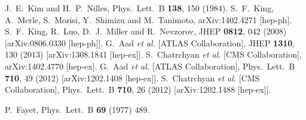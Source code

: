 \documentclass[final,3p,11pt,pdflatex]{elsarticle}
\begin{document}
\begin{thebibliography}{100}
  J.~E.~Kim and H.~P.~Nilles,
  Phys.\ Lett.\ B {\bf 138}, 150 (1984).
  S.~F.~King, A.~Merle, S.~Morisi, Y.~Shimizu and M.~Tanimoto,
  arXiv:1402.4271 [hep-ph].
  S.~F.~King, R.~Luo, D.~J.~Miller and R.~Nevzorov,
  JHEP {\bf 0812}, 042 (2008)
  [arXiv:0806.0330 [hep-ph]].
  G.~Aad {\it et al.}  [ATLAS Collaboration],
  JHEP {\bf 1310}, 130 (2013)
  [arXiv:1308.1841 [hep-ex]].
  S.~Chatrchyan {\it et al.}  [CMS Collaboration],
  arXiv:1402.4770 [hep-ex].
  G.~Aad {\it et al.}  [ATLAS Collaboration],
  Phys.\ Lett.\ B {\bf 710}, 49 (2012)
  [arXiv:1202.1408 [hep-ex]].
  S.~Chatrchyan {\it et al.}  [CMS Collaboration],
  Phys.\ Lett.\ B {\bf 710}, 26 (2012)
  [arXiv:1202.1488 [hep-ex]].

  P.~Fayet,
  Phys.\ Lett.\ B {\bf 69} (1977) 489.


\end{thebibliography}
\end{document}
